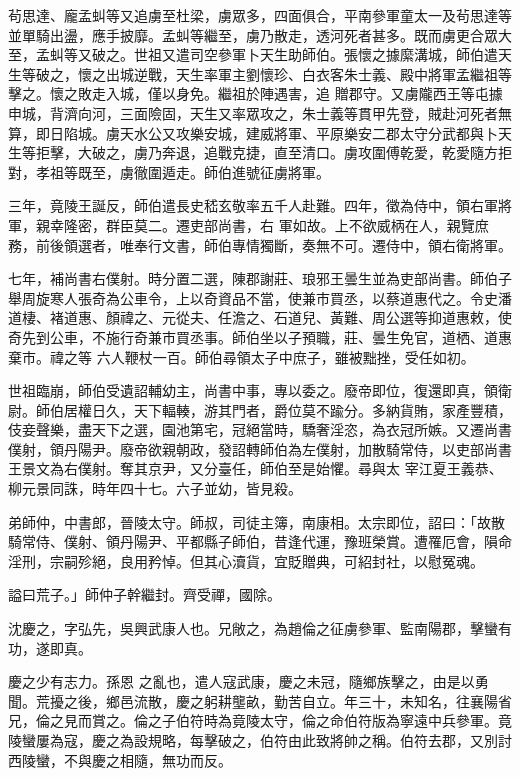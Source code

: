 \begin{pinyinscope}
 茍思達、龐孟虯等又追虜至杜梁，虜眾多，四面俱合，平南參軍童太一及茍思達等並單騎出盪，應手披靡。孟虯等繼至，虜乃散走，透河死者甚多。既而虜更合眾大至，孟虯等又破之。世祖又遣司空參軍卜天生助師伯。張懷之據縻溝城，師伯遣天生等破之，懷之出城逆戰，天生率軍主劉懷珍、白衣客朱士義、殿中將軍孟繼祖等擊之。懷之敗走入城，僅以身免。繼祖於陣遇害，追
 贈郡守。又虜隴西王等屯據申城，背濟向河，三面險固，天生又率眾攻之，朱士義等貫甲先登，賊赴河死者無算，即日陷城。虜天水公又攻樂安城，建威將軍、平原樂安二郡太守分武都與卜天生等拒擊，大破之，虜乃奔退，追戰克捷，直至清口。虜攻圍傅乾愛，乾愛隨方拒對，孝祖等既至，虜徹圍遁走。師伯進號征虜將軍。



 三年，竟陵王誕反，師伯遣長史嵇玄敬率五千人赴難。四年，徵為侍中，領右軍將軍，親幸隆密，群臣莫二。遷吏部尚書，右
 軍如故。上不欲威柄在人，親覽庶務，前後領選者，唯奉行文書，師伯專情獨斷，奏無不可。遷侍中，領右衛將軍。



 七年，補尚書右僕射。時分置二選，陳郡謝莊、琅邪王曇生並為吏部尚書。師伯子舉周旋寒人張奇為公車令，上以奇資品不當，使兼市買丞，以蔡道惠代之。令史潘道棲、褚道惠、顏禕之、元從夫、任澹之、石道兒、黃難、周公選等抑道惠敕，使奇先到公車，不施行奇兼市買丞事。師伯坐以子預職，莊、曇生免官，道栖、道惠棄市。禕之等
 六人鞭杖一百。師伯尋領太子中庶子，雖被黜挫，受任如初。



 世祖臨崩，師伯受遺詔輔幼主，尚書中事，專以委之。廢帝即位，復還即真，領衛尉。師伯居權日久，天下輻輳，游其門者，爵位莫不踰分。多納貨賄，家產豐積，伎妾聲樂，盡天下之選，園池第宅，冠絕當時，驕奢淫恣，為衣冠所嫉。又遷尚書僕射，領丹陽尹。廢帝欲親朝政，發詔轉師伯為左僕射，加散騎常侍，以吏部尚書王景文為右僕射。奪其京尹，又分臺任，師伯至是始懼。尋與太
 宰江夏王義恭、柳元景同誅，時年四十七。六子並幼，皆見殺。



 弟師仲，中書郎，晉陵太守。師叔，司徒主簿，南康相。太宗即位，詔曰：「故散騎常侍、僕射、領丹陽尹、平都縣子師伯，昔逢代運，豫班榮賞。遭罹厄會，隕命淫刑，宗嗣殄絕，良用矜悼。但其心瀆貨，宜貶贈典，可紹封社，以慰冤魂。



 謚曰荒子。」師仲子幹繼封。齊受禪，國除。



 沈慶之，字弘先，吳興武康人也。兄敞之，為趙倫之征虜參軍、監南陽郡，擊蠻有功，遂即真。



 慶之少有志力。孫恩
 之亂也，遣人寇武康，慶之未冠，隨鄉族擊之，由是以勇聞。荒擾之後，鄉邑流散，慶之躬耕壟畝，勤苦自立。年三十，未知名，往襄陽省兄，倫之見而賞之。倫之子伯符時為竟陵太守，倫之命伯符版為寧遠中兵參軍。竟陵蠻屢為寇，慶之為設規略，每擊破之，伯符由此致將帥之稱。伯符去郡，又別討西陵蠻，不與慶之相隨，無功而反。




\end{pinyinscope}
